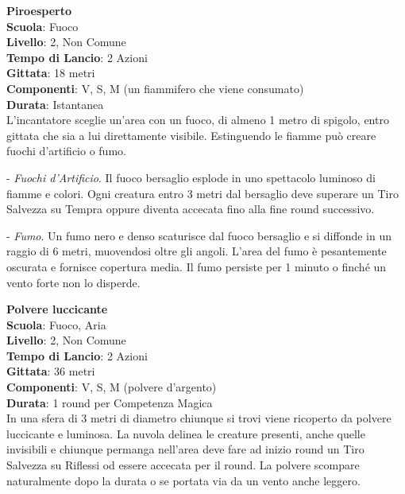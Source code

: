 \begin{multicols}{2}
\medskip\textbf{Piroesperto}\\
\textbf{Scuola}: Fuoco\\
\textbf{Livello}: 2, Non Comune\\
\textbf{Tempo di Lancio}: 2 Azioni\\
\textbf{Gittata}: 18 metri\\
\textbf{Componenti}: V, S, M (un fiammifero che viene consumato)\\
\textbf{Durata}: Istantanea\\
L’incantatore sceglie un’area con un fuoco, di almeno 1 metro di spigolo, entro gittata che sia a lui direttamente visibile. Estinguendo le fiamme può creare fuochi d’artificio o fumo.

- \textit{Fuochi d’Artificio}. Il fuoco bersaglio esplode in uno spettacolo luminoso di fiamme e colori. Ogni creatura entro 3 metri dal bersaglio deve superare un Tiro Salvezza su Tempra oppure diventa accecata fino alla fine round successivo.

- \textit{Fumo}. Un fumo nero e denso scaturisce dal fuoco bersaglio e si diffonde in un raggio di 6 metri, muovendosi oltre gli angoli. L’area del fumo è pesantemente oscurata e fornisce copertura media. Il fumo persiste per 1 minuto o finché un vento forte non lo disperde.

\medskip\textbf{Polvere luccicante}\\
\textbf{Scuola}: Fuoco, Aria\\
\textbf{Livello}: 2, Non Comune\\
\textbf{Tempo di Lancio}: 2 Azioni\\
\textbf{Gittata}: 36 metri\\
\textbf{Componenti}: V, S, M (polvere d'argento)\\
\textbf{Durata}: 1 round per Competenza Magica\\
In una sfera di 3 metri di diametro chiunque si trovi viene ricoperto da polvere luccicante e luminosa. La nuvola delinea le creature presenti, anche quelle invisibili e chiunque permanga nell'area deve fare ad inizio round un Tiro Salvezza su Riflessi od essere accecata per il round. La polvere scompare naturalmente dopo la durata o se portata via da un vento anche leggero.


\end{multicols}

